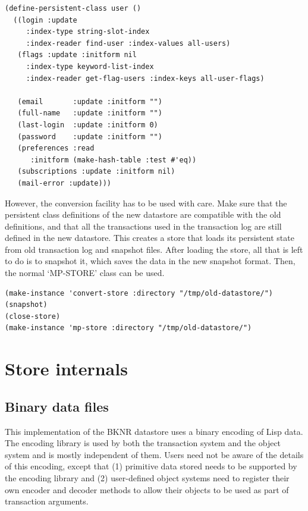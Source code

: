 \begin{Verbatim}[fontsize=\small,frame=leftline,framerule=0.9mm,rulecolor=\color{gray},framesep=5.1mm,xleftmargin=5mm,fontfamily=cmtt]
(define-persistent-class user ()
  ((login :update
     :index-type string-slot-index
     :index-reader find-user :index-values all-users)
   (flags :update :initform nil
     :index-type keyword-list-index
     :index-reader get-flag-users :index-keys all-user-flags)
   
   (email       :update :initform "")
   (full-name   :update :initform "")
   (last-login  :update :initform 0)
   (password    :update :initform "")
   (preferences :read
      :initform (make-hash-table :test #'eq))
   (subscriptions :update :initform nil)
   (mail-error :update)))
\end{Verbatim}
However, the conversion facility has to be used with care. Make
sure that the persistent class definitions of the new datastore
are compatible with the old definitions, and that all the
transactions used in the transaction log are still defined in the
new datastore.
This creates a store that loads its persistent state from old
transaction log and snapshot files. After loading the store, all
that is left to do is to snapshot it, which saves the data in the
new snapshot format. Then, the normal `MP-STORE' class can be used.

\begin{Verbatim}[fontsize=\small,frame=leftline,framerule=0.9mm,rulecolor=\color{gray},framesep=5.1mm,xleftmargin=5mm,fontfamily=cmtt]
(make-instance 'convert-store :directory "/tmp/old-datastore/")
(snapshot)
(close-store)
(make-instance 'mp-store :directory "/tmp/old-datastore/")
\end{Verbatim}


\section{ Store internals}


\subsection{ Binary data files}

This implementation of the BKNR datastore uses a binary encoding
of Lisp data. The encoding library is used by both the transaction
system and the object system and is mostly independent of
them. Users need not be aware of the details of this encoding,
except that (1) primitive data stored needs to be supported by the
encoding library and (2) user-defined object systems need to
register their own encoder and decoder methods to allow their
objects to be used as part of transaction arguments.

